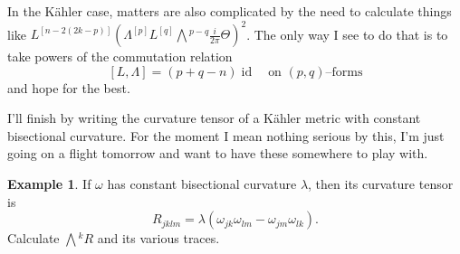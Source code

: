 \documentclass[11pt,a4paper]{amsart}
\def\^#1{^{[#1]}}
\def\bw#1{\bigwedge{}^{\! #1}}
\DeclareMathOperator{\id}{id}
\def\curv{\frac{i}{2\pi} \Theta}
\theoremstyle{definition}
\newtheorem{exam}[theo]{Example}
\numberwithin{equation}{section}
\begin{document}
In the K\"{a}hler case, matters are also complicated by the need to
calculate things like $L\^{n-2(2k-p)}(\Lambda\^p L\^{q} \bw{p-q}\curv)^2$.
The only way I see to do that is to take powers of the commutation relation
$$
[L, \Lambda] = (p + q - n) \id
\quad\text{on $(p,q)$--forms}
$$
and hope for the best.

I'll finish by writing the curvature tensor of a K\"{a}hler metric with
constant bisectional curvature. For the moment I mean nothing serious by
this, I'm just going on a flight tomorrow and want to have these somewhere
to play with.


\begin{exam}
If $\omega$ has constant bisectional curvature $\lambda$, then its
curvature tensor is 
$$
R_{jklm} = \lambda(\omega_{jk} \omega_{lm} - \omega_{jm} \omega_{lk}).
$$ 
Calculate $\bw{k}R$ and its various traces.
\end{exam}





\end{document}
